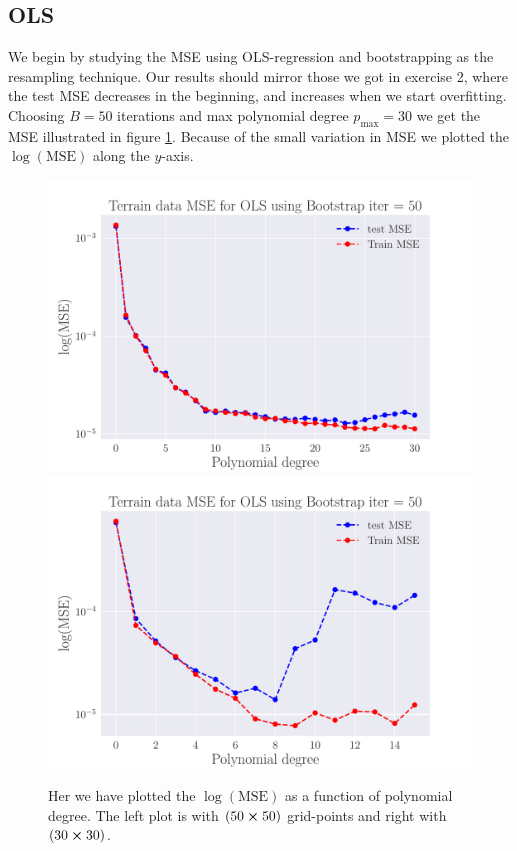 \documentclass[reprint,english,notitlepage,aps,nobalancelastpage,nofootinbib]{revtex4-1}  %
\begin{document}
\subsection*{OLS}
We begin by studying the MSE using OLS-regression and bootstrapping as the resampling technique. Our results should mirror those we got in exercise 2, where the test MSE decreases in the beginning, and increases when we start overfitting. Choosing $B = 50$ iterations and max polynomial degree $p_\text{max} = 30$ we get the MSE illustrated in figure \ref{fig:terrain_OLS_MSE_bootstrap}. Because of the small variation in MSE we plotted the $\log(\text{MSE})$ along the $y$-axis.

\begin{figure}[h]
  \includegraphics[width=\linewidth]{SRTM_MSE_OLS_n50_pol30_Bootstrap_re50_log.pdf}
  \endminipage\hfill
  \includegraphics[width=\linewidth]{SRTM_MSE_OLS_n30_pol15_Bootstrap_re50_log.pdf}
  \endminipage
  \caption{Her we have plotted the $\log(\text{MSE})$ as a function of polynomial degree. The left plot is with $(50\cross50)$ grid-points and right with $(30\cross30)$.}
  \label{fig:terrain_OLS_MSE_bootstrap}
\end{figure}
\end{document}
